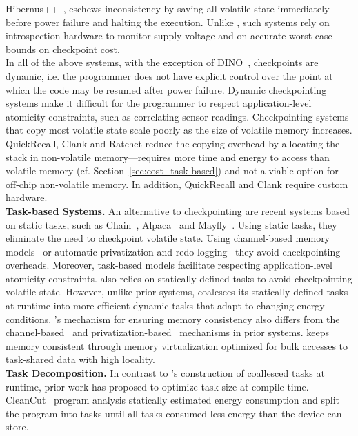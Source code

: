 Hibernus++~\cite{hibernusplusplus}, eschews inconsistency by saving all
volatile state immediately before power failure and halting the execution.
Unlike \sys, such systems rely on introspection hardware to monitor supply
voltage and on accurate worst-case bounds on checkpoint cost. \\
%
In all of the above systems, with the exception of DINO~\cite{dino},
checkpoints are dynamic, i.e. the programmer does not have explicit control
over the point at which the code may be resumed after power failure.
%
Dynamic checkpointing systems make it difficult for the programmer to respect
application-level atomicity constraints, such as correlating sensor readings.
%
Checkpointing systems that copy most volatile state scale poorly as the
size of volatile memory increases.  QuickRecall, Clank and Ratchet reduce
the copying overhead by allocating the stack in non-volatile memory---requires more time and energy to access than volatile memory (cf.
Section~\ref{sec:cost_task-based}) and not a viable option for off-chip non-volatile
memory. In addition, QuickRecall and Clank require custom hardware.  \\
%
\textbf{Task-based Systems.} An alternative to checkpointing are recent systems
based on static tasks, such as Chain~\cite{chain}, Alpaca~\cite{alpaca} and
Mayfly~\cite{hester_sensys_2017}. Using static tasks, they eliminate
the need to checkpoint volatile state. Using channel-based memory
models~\cite{chain,hester_sensys_2017} or automatic privatization and
redo-logging~\cite{alpaca} they avoid checkpointing overheads. Moreover,
task-based models facilitate respecting application-level atomicity
constraints.
%
\sys also relies on
statically defined tasks to avoid checkpointing volatile state. 
%
However, unlike prior systems, \sys coalesces its statically-defined tasks at
runtime into more efficient dynamic tasks that adapt to changing energy
conditions.
%
\sys's mechanism for ensuring memory consistency also differs from the
channel-based~\cite{chain} and privatization-based~\cite{alpaca} mechanisms in
prior systems. \sys keeps memory consistent through memory virtualization
optimized for bulk accesses to task-shared data with high locality. \\
%
\textbf{Task Decomposition.} In contrast to \sys's construction of
coallesced tasks at runtime, prior work has proposed to optimize task size
at compile time. CleanCut~\cite{cleancut_2018} program analysis statically
estimated energy consumption and split the program into tasks until all tasks
consumed less energy than the device can store.
